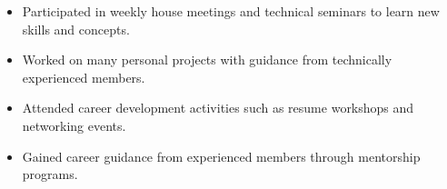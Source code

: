 \medskip


\begin{itemize}
  \item Participated in weekly house meetings and technical seminars to learn new skills and concepts.
  \item Worked on many personal projects with guidance from technically experienced members.
\end{itemize}


\divider

\begin{itemize}
  \item Attended career development activities such as resume workshops and networking events.
  \item Gained career guidance from experienced members through mentorship programs.
\end{itemize}


